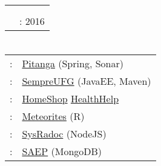 \documentclass[a4paper,10pt]{article} %
\begin{document}

\section{\educationSection}

\begin{tabular}{r|p{11cm}}
	\emph{\bachelorDegree} & \softwareEngineering \\
	& \emph{\INF} \daOf \emph{\UFG} \\
	& \finishEducation: 2016\\
\end{tabular}


\section{\collegeProjectsSection}

\begin{tabular}{rp{11cm}}
	\devOpsResponsible: &
	\href{https://github.com/SaladaDeFrutas/Pitanga}{Pitanga}
	(Spring, Sonar) \\
	\integrationResponsible: &
	\href{https://github.com/ES-INF-UFG-2016-2/Sempre-UFG}{SempreUFG}
	(JavaEE, Maven)\\
	\androidConcepts: &
	\href{https://github.com/Yuri-M-Dias/HomeShop}{HomeShop} \andWord
	\href{https://github.com/Yuri-M-Dias/HealthHelp}{HealthHelp} \\
	\dataVisualization: &
	\href{https://github.com/Yuri-M-Dias/meteorites}{Meteorites} (R) \\
	\verificationAndValidationResponsible: &
	\href{https://bitbucket.org/SysRadocTeam/sysradoc}{SysRadoc}
	(NodeJS) \\
	\apiImplementation: &
	\href{https://github.com/Yuri-M-Dias/SAEP}{SAEP} (MongoDB) \\

\end{tabular}

\end{document}
